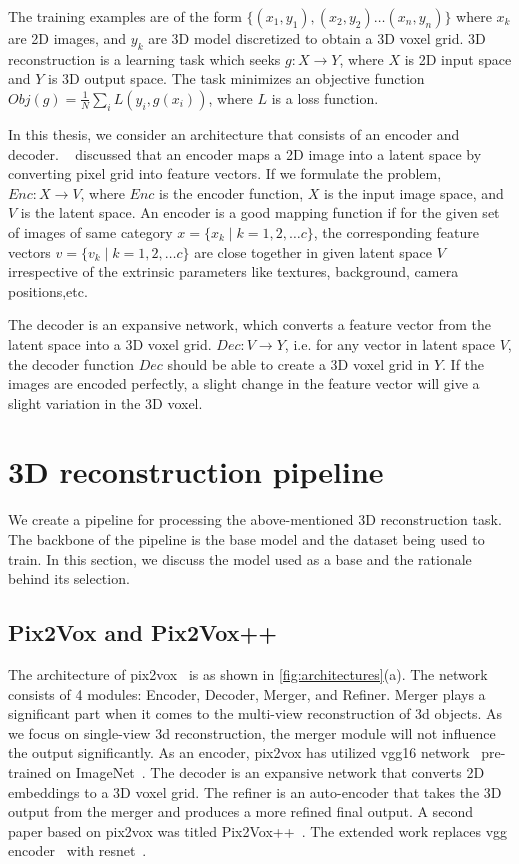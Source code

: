 The training examples are of the form  $\{(x_1,y_1),(x_2,y_2) \dots(x_n,y_n)\}$ where $x_k$ are 2D images, and $y_k$ are 3D model discretized to obtain a 3D voxel grid.
3D reconstruction is a learning task which seeks $g: X \to Y$, where $X$ is 2D input space and $Y$ is 3D output space.
The task minimizes an objective function $Obj(g) = \frac{1}{N} \sum_i L(y_i, g(x_i))$, where $L$ is a loss function.

In this thesis, we consider an architecture that consists of an encoder and decoder.
~\cite{Han2021ImageBased3O} discussed that an encoder maps a 2D image into a latent space by converting pixel grid into feature vectors.
If we formulate the problem, $Enc: X \to V$, where $Enc$ is the encoder function, $X$ is the input image space, and $V$ is the latent space.
An encoder is a good mapping function if for the given set of images of same category $x = \{x_k \mid k = 1,2,\dots c\}$, the corresponding feature vectors $v = \{v_k \mid k = 1,2,\dots c\}$ are close together in given latent space $V$
irrespective of the extrinsic parameters like textures, background, camera positions,etc.

The decoder is an expansive network, which converts a feature vector from the latent space into a 3D voxel grid.
$Dec: V \to Y$, i.e. for any vector in latent space $V$, the decoder function \textbf{$Dec$} should be able to create a 3D voxel grid in $Y$.
If the images are encoded perfectly, a slight change in the feature vector will give a slight variation in the 3D voxel.

\section{3D reconstruction pipeline}\label{sec:3D reconstruction pipeline}
We create a pipeline for processing the above-mentioned 3D reconstruction task.
The backbone of the pipeline is the base model and the dataset being used to train.
In this section, we discuss the model used as a base and the rationale behind its selection.

\subsection{Pix2Vox and Pix2Vox++}\label{subsec:pix2vox-and-pix2vox++}
The architecture of pix2vox~\cite{Xie_2019} is as shown in \autoref{fig:architectures}(a).
The network consists of 4 modules: Encoder, Decoder, Merger, and Refiner.
Merger plays a significant part when it comes to the multi-view reconstruction of 3d objects.
As we focus on single-view 3d reconstruction, the merger module will not influence the output significantly.
As an encoder, pix2vox has utilized \gls{vgg}16 network~\cite{simonyan2015deep} pre-trained on ImageNet~\cite{Deng2009ImageNetAL}.
The decoder is an expansive network that converts 2D embeddings to a 3D voxel grid.
The refiner is an auto-encoder that takes the 3D output from the merger and produces a more refined final output.
A second paper based on pix2vox was titled Pix2Vox++~\cite{Xie_2020}.
The extended work replaces \gls{vgg} encoder~\cite{simonyan2015deep} with \gls{resnet}~\cite{He2016DeepRL}.

